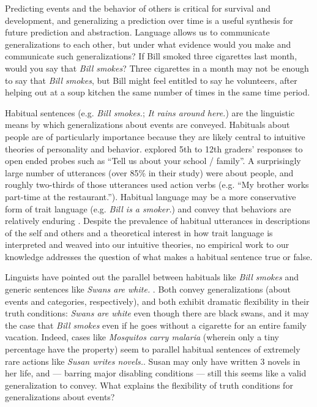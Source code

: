 \documentclass[10pt,letterpaper]{article}
\begin{document}
Predicting events and the behavior of others is critical for survival and development, and generalizing a prediction over time is a useful synthesis for future prediction and abstraction.
Language allows us to communicate generalizations to each other, but under what evidence would you make and communicate such generalizations?
If Bill smoked three cigarettes last month, would you say that \emph{Bill smokes}?
Three cigarettes in a month may not be enough to say that \emph{Bill smokes}, but Bill might feel entitled to say he volunteers, after helping out at a soup kitchen the same number of times in the same time period.

Habitual sentences (e.g. \emph{Bill smokes.}; \emph{It rains around here.}) are the linguistic means by which generalizations about events are conveyed.
Habituals about people are of particularly importance because they are likely central to intuitive theories of personality and behavior. 
 explored 5th to 12th graders' responses to open ended probes such as ``Tell us about your school / family''. 
A surprisingly large number of utterances (over 85\% in their study) were about people, and roughly two-thirds of those utterances used action verbs (e.g. ``My brother works part-time at the restaurant.''). 
Habitual language may be a more conservative form of trait language (e.g. \emph{Bill is a smoker.}) and convey that behaviors are relatively enduring \cite{Gelman1999, Gelman2004}.
Despite the prevalence of habitual utterances in descriptions of the self and others and a theoretical interest in how trait language is interpreted and weaved into our intuitive theories, no empirical work to our knowledge addresses the question of what makes a habitual sentence true or false.

Linguists have pointed out the parallel between habituals like \emph{Bill smokes} and generic sentences like \emph{Swans are white.} \cite{Carlson1977, Carlson2005, Cohen1999}.
Both convey generalizations (about events and categories, respectively), and both exhibit dramatic flexibility in their truth conditions: \emph{Swans are white} even though there are black swans, and it may the case that \emph{Bill smokes} even if he goes without a cigarette for an entire family vacation.
Indeed, cases like \emph{Mosquitos carry malaria} (wherein only a tiny percentage have the property) seem to parallel habitual sentences of extremely rare actions like \emph{Susan writes novels.}. Susan may only have written 3 novels in her life, and --- barring major disabling conditions --- still this seems like a valid generalization to convey.
What explains the flexibility of truth conditions for generalizations about events?
\end{document}
